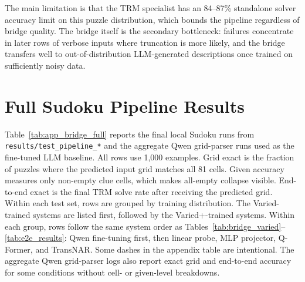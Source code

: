 \documentclass[11pt]{article}
\begin{document}
The main limitation is that the TRM specialist has an 84--87\% standalone solver accuracy limit on this puzzle distribution, which bounds the pipeline regardless of bridge quality.
The bridge itself is the secondary bottleneck: failures concentrate in later rows of verbose inputs where truncation is more likely, and the bridge transfers well to out-of-distribution LLM-generated descriptions once trained on sufficiently noisy data.



\clearpage
\appendix

\section{Full Sudoku Pipeline Results}
\label{app:full_pipeline_results}

Table~\ref{tab:app_bridge_full} reports the final local Sudoku runs from \texttt{results/test\_pipeline\_*} and the aggregate Qwen grid-parser runs used as the fine-tuned LLM baseline.
All rows use 1,000 examples.
Grid exact is the fraction of puzzles where the predicted input grid matches all 81 cells.
Given accuracy measures only non-empty clue cells, which makes all-empty collapse visible.
End-to-end exact is the final TRM solve rate after receiving the predicted grid.
Within each test set, rows are grouped by training distribution.
The Varied-trained systems are listed first, followed by the Varied+-trained systems.
Within each group, rows follow the same system order as Tables~\ref{tab:bridge_varied}--\ref{tab:e2e_results}: Qwen fine-tuning first, then linear probe, MLP projector, Q-Former, and TransNAR.
Some dashes in the appendix table are intentional.
The aggregate Qwen grid-parser logs also report exact grid and end-to-end accuracy for some conditions without cell- or given-level breakdowns.
\end{document}
